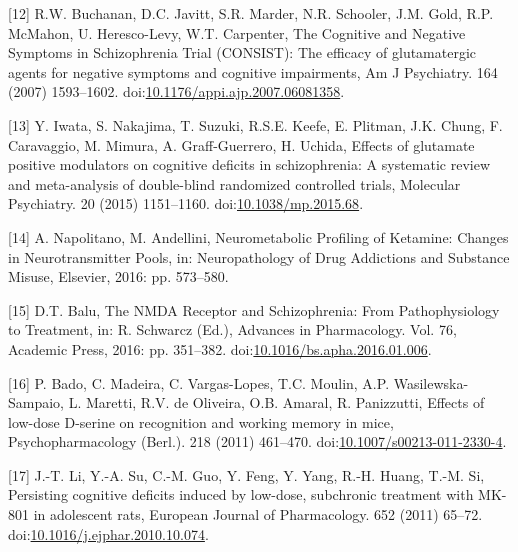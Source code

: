\documentclass[man]{apa6}
\begin{document}
\leavevmode\hypertarget{ref-buchananCognitiveNegativeSymptoms2007}{}%
{[}12{]} R.W. Buchanan, D.C. Javitt, S.R. Marder, N.R. Schooler, J.M. Gold, R.P. McMahon, U. Heresco-Levy, W.T. Carpenter, The Cognitive and Negative Symptoms in Schizophrenia Trial (CONSIST): The efficacy of glutamatergic agents for negative symptoms and cognitive impairments, Am J Psychiatry. 164 (2007) 1593--1602. doi:\href{https://doi.org/10.1176/appi.ajp.2007.06081358}{10.1176/appi.ajp.2007.06081358}.

\leavevmode\hypertarget{ref-iwataEffectsGlutamatePositive2015}{}%
{[}13{]} Y. Iwata, S. Nakajima, T. Suzuki, R.S.E. Keefe, E. Plitman, J.K. Chung, F. Caravaggio, M. Mimura, A. Graff-Guerrero, H. Uchida, Effects of glutamate positive modulators on cognitive deficits in schizophrenia: A systematic review and meta-analysis of double-blind randomized controlled trials, Molecular Psychiatry. 20 (2015) 1151--1160. doi:\href{https://doi.org/10.1038/mp.2015.68}{10.1038/mp.2015.68}.

\leavevmode\hypertarget{ref-napolitanoNeurometabolicProfilingKetamine2016}{}%
{[}14{]} A. Napolitano, M. Andellini, Neurometabolic Profiling of Ketamine: Changes in Neurotransmitter Pools, in: Neuropathology of Drug Addictions and Substance Misuse, Elsevier, 2016: pp. 573--580.

\leavevmode\hypertarget{ref-baluNMDAReceptorSchizophrenia2016}{}%
{[}15{]} D.T. Balu, The NMDA Receptor and Schizophrenia: From Pathophysiology to Treatment, in: R. Schwarcz (Ed.), Advances in Pharmacology. Vol. 76, Academic Press, 2016: pp. 351--382. doi:\href{https://doi.org/10.1016/bs.apha.2016.01.006}{10.1016/bs.apha.2016.01.006}.

\leavevmode\hypertarget{ref-badoEffectsLowdoseDserine2011}{}%
{[}16{]} P. Bado, C. Madeira, C. Vargas-Lopes, T.C. Moulin, A.P. Wasilewska-Sampaio, L. Maretti, R.V. de Oliveira, O.B. Amaral, R. Panizzutti, Effects of low-dose D-serine on recognition and working memory in mice, Psychopharmacology (Berl.). 218 (2011) 461--470. doi:\href{https://doi.org/10.1007/s00213-011-2330-4}{10.1007/s00213-011-2330-4}.

\leavevmode\hypertarget{ref-liPersistingCognitiveDeficits2011}{}%
{[}17{]} J.-T. Li, Y.-A. Su, C.-M. Guo, Y. Feng, Y. Yang, R.-H. Huang, T.-M. Si, Persisting cognitive deficits induced by low-dose, subchronic treatment with MK-801 in adolescent rats, European Journal of Pharmacology. 652 (2011) 65--72. doi:\href{https://doi.org/10.1016/j.ejphar.2010.10.074}{10.1016/j.ejphar.2010.10.074}.
\end{document}
